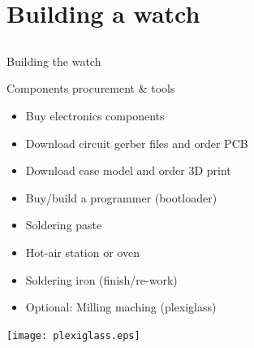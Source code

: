 \documentclass[compress,red]{beamer}
\begin{document}
\section{Building a watch}

\subsection*{} %

\begin{frame}{Building the watch}

  Components procurement \& tools

  \begin{itemize}
  \item Buy electronics components
  \item Download circuit gerber files and order PCB
  \item Download case model and order 3D print
  \item Buy/build a programmer (bootloader)
  \item Soldering paste
  \item Hot-air station or oven
  \item Soldering iron (finish/re-work)
  \item Optional: Milling maching (plexiglass)
  \end{itemize}

  \begin{center}
    \texttt{[image: plexiglass.eps]}
  \end{center}


\end{frame}
\end{document}
